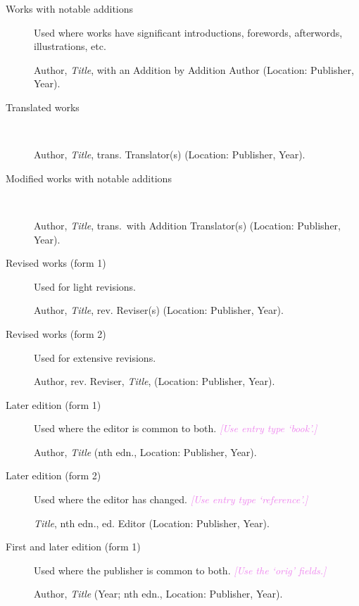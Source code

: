 \documentclass[extrafontsizes,11pt,a4paper,oneside]{memoir}
\newcommand*{\lit}[1]{\textsf{#1}}
\newcommand*{\code}[1]{`\textsf{#1}'}
\newcommand*{\aside}[1]{\textcolor{violet}{\emph{[#1]}}}
\begin{document}
    \begin{description}
        \item[Works with notable additions] Used where works have significant introductions, forewords, afterwords, illustrations, etc.\par
        Author, \emph{Title}, \lit{with an} Addition \lit{by} Addition Author (Location: Publisher, Year).
        \\
        
        \item[Translated works]~\par
        Author, \emph{Title}, \lit{trans.} Translator(s) (Location: Publisher, Year).
        \\
        
        \item[Modified works with notable additions]~\par
        Author, \emph{Title}, \lit{trans.\ with} Addition Translator(s) (Location: Publisher, Year).
        \\
        
        \item[Revised works (form 1)] Used for light revisions.
        \par Author, \emph{Title}, \lit{rev.} Reviser(s) (Location: Publisher, Year).
        
        \item[Revised works (form 2)] Used for extensive revisions.
        \par Author, \lit{rev.} Reviser, \emph{Title}, (Location: Publisher, Year).
        
        \item[Later edition (form 1)] Used where the editor is common to both. \aside{Use entry type \code{book}.}
        \par Author, \emph{Title} (nth \lit{edn.}, Location: Publisher, Year).
        \\
        
        \item[Later edition (form 2)] Used where the editor has changed. \aside{Use entry type \code{reference}.}
        \par \emph{Title}, nth \lit{edn.}, \lit{ed.} Editor (Location: Publisher, Year).
        \\
        
        \item[First and later edition (form 1)] Used where the publisher is common to both. \aside{Use the \code{orig} fields.}
        \par Author, \emph{Title} (Year; nth \lit{edn.}, Location: Publisher, Year).
        \\
        \\
        

\end{description}
\end{document}
